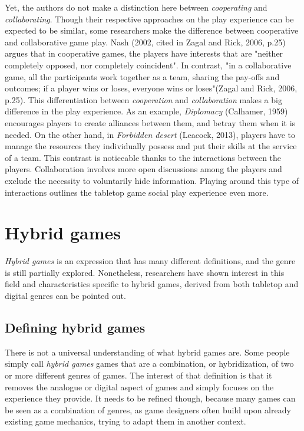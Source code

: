 Yet, the authors do not make a distinction here between \textit{cooperating} and \textit{collaborating}. Though their respective approaches on the play experience can be expected to be similar, some researchers make the difference between cooperative and collaborative game play. Nash (2002, cited in Zagal and Rick, 2006, p.25)\cite{art:collab} argues that in cooperative games, the players have interests that are "neither completely opposed, nor completely coincident". In contrast, "in a collaborative game, all the participants work together as a team, sharing the pay-offs and outcomes; if a player wins or loses, everyone wins or loses"(Zagal and Rick, 2006, p.25)\cite{art:collab}. This differentiation between \textit{cooperation} and \textit{collaboration} makes a big difference in the play experience. As an example, \textit{Diplomacy} (Calhamer, 1959)\cite{game:diplo} encourages players to create alliances between them, and betray them when it is needed. On the other hand, in \textit{Forbidden desert} (Leacock, 2013)\cite{game:desert}, players have to manage the resources they individually possess and put their skills at the service of a team. 
This contrast is noticeable thanks to the interactions between the players. Collaboration involves more open discussions among the players and exclude the necessity to voluntarily hide information. Playing around this type of interactions outlines the tabletop game social play experience even more.
\section{Hybrid games}
\textit{Hybrid games} is an expression that has many different definitions, and the genre is still partially explored. Nonetheless, researchers have shown interest in this field and characteristics specific to hybrid games, derived from both tabletop and digital genres can be pointed out.
\subsection{Defining hybrid games}
There is not a universal understanding of what hybrid games are. Some people simply call \textit{hybrid games} games that are a combination, or hybridization, of two or more different genres of games. The interest of that definition is that it removes the analogue or digital aspect of games and simply focuses on the experience they provide. It needs to be refined though, because many games can be seen as a combination of genres, as game designers often build upon already existing game mechanics, trying to adapt them in another context. 

